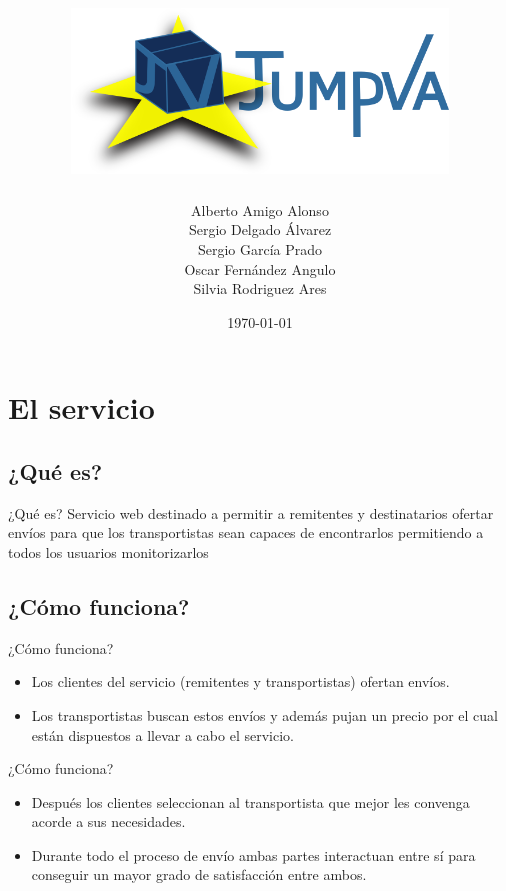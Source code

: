 \documentclass{beamer}
\title{
    \centering
    {\includegraphics[width=0.75\textwidth]{res/logo}}
}
\date{
    \today
}
\author{
    Alberto Amigo Alonso \\
    Sergio Delgado Álvarez \\
    Sergio García Prado \\
    Oscar Fernández Angulo \\
    Silvia Rodriguez Ares \\
}
\institute{Universidad de Valladolid}
\begin{document}
    \maketitle

    \section{El servicio}

        \subsection{¿Qué es?}

            \begin{frame}{¿Qué es?}
                Servicio web destinado a permitir a remitentes y destinatarios ofertar envíos para que los transportistas sean capaces de encontrarlos permitiendo a todos los usuarios monitorizarlos
            \end{frame}

        \subsection{¿Cómo funciona?}
            \begin{frame}{¿Cómo funciona?}
                \begin{itemize}
                    \item Los clientes del servicio (remitentes y transportistas) ofertan envíos.

                    \item Los transportistas buscan estos envíos y además pujan un precio por el cual están dispuestos a llevar a cabo el servicio.
                \end{itemize}
            \end{frame}

            \begin{frame}{¿Cómo funciona?}
                \begin{itemize}
                    \item Después los clientes seleccionan al transportista que mejor les convenga acorde a sus necesidades.

                    \item Durante todo el proceso de envío ambas partes interactuan entre sí para conseguir un mayor grado de satisfacción entre ambos.
                \end{itemize}
            \end{frame}
\end{document}
